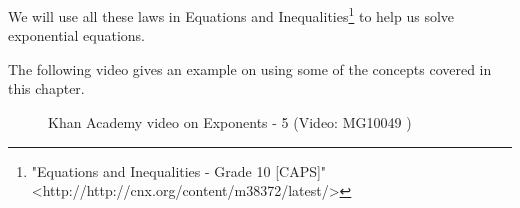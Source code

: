     \par
      \label{m38359*eip-117}We will use all these laws in Equations and Inequalities\footnote{\raggedright{}"Equations and Inequalities - Grade 10 [CAPS]" <http://http://cnx.org/content/m38372/latest/>} to help us solve exponential equations.\par \label{m38359*eip-160}The following video gives an example on using some of the concepts covered in this chapter.
    \setcounter{subfigure}{0}
	\begin{figure}[H] %
    \textnormal{Khan Academy video on Exponents - 5}\vspace{.1in} \nopagebreak
  \label{m38359*yt-media5}\label{m38359*yt-video5}
             { (Video:  MG10049 )}
      \vspace{2pt}
    \vspace{.1in}
 \end{figure}       \par 
